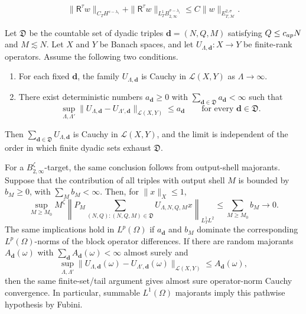 \documentclass[10pt,a4paper]{amsart}
\newcommand{\Ret}{\mathsf R}
\newcommand{\cM}{\mathcal M}
\begin{document}
\begin{equation}\label{eq:retained-main-bound}
        \|\Ret^\tau w\|_{C_TH^{s-\lambda_i}}
        +\|\Ret^\tau w\|_{L_T^1B^{\sigma-\lambda_i}_{2,\infty}}
        \le C\|w\|_{E_{T,\cM}^{2,\sigma}} .
\end{equation}

\begin{lemma}\label{lem:dyadic-tail-assembly}
Let \(\mathfrak D\) be the countable set of dyadic triples \(\mathbf d=(N,Q,M)\) satisfying \(Q\le c_{\rm ap}N\) and \(M\lesssim N\).  Let \(X\) and \(Y\) be Banach spaces, and let \(U_{\Lambda,\mathbf d}:X\to Y\) be finite-rank operators.  Assume the following two conditions.
\begin{enumerate}[label=(\roman*)]
\item For each fixed \(\mathbf d\), the family \(U_{\Lambda,\mathbf d}\) is Cauchy in \(\mathcal L(X,Y)\) as \(\Lambda\to\infty\).
\item There exist deterministic numbers \(a_{\mathbf d}\ge0\) with \(\sum_{\mathbf d\in\mathfrak D}a_{\mathbf d}<\infty\) such that
\[
        \sup_{\Lambda,\Lambda'}
        \|U_{\Lambda,\mathbf d}-U_{\Lambda',\mathbf d}\|_{\mathcal L(X,Y)}
        \le a_{\mathbf d}
        \qquad \text{for every }\mathbf d\in\mathfrak D .
\]
\end{enumerate}
Then \(\sum_{\mathbf d\in\mathfrak D}U_{\Lambda,\mathbf d}\) is Cauchy in \(\mathcal L(X,Y)\), and the limit is independent of the order in which finite dyadic sets exhaust \(\mathfrak D\).

For a \(B_{2,\infty}^{\zeta}\)-target, the same conclusion follows from output-shell majorants.  Suppose that the contribution of all triples with output shell \(M\) is bounded by \(b_M\ge0\), with \(\sum_Mb_M<\infty\).  Then, for \(\|x\|_X\le1\),
\begin{equation}\label{eq:Besov-tail-assembly}
        \sup_{M\ge M_0} M^\zeta
        \left\|P_M\sum_{(N,Q):(N,Q,M)\in\mathfrak D} U_{\Lambda,N,Q,M}x\right\|_{L_T^1L^2}
        \le \sum_{M\ge M_0} b_M
        \longrightarrow0 .
\end{equation}
The same implications hold in \(L^p(\Omega)\) if \(a_{\mathbf d}\) and \(b_M\) dominate the corresponding \(L^p(\Omega)\)-norms of the block operator differences.  If there are random majorants \(A_{\mathbf d}(\omega)\) with \(\sum_{\mathbf d}A_{\mathbf d}(\omega)<\infty\) almost surely and
\[
        \sup_{\Lambda,\Lambda'}
        \|U_{\Lambda,\mathbf d}(\omega)-U_{\Lambda',\mathbf d}(\omega)\|_{\mathcal L(X,Y)}
        \le A_{\mathbf d}(\omega),
\]
then the same finite-set/tail argument gives almost sure operator-norm Cauchy convergence.  In particular, summable \(L^1(\Omega)\) majorants imply this pathwise hypothesis by Fubini.
\end{lemma}
\end{document}
